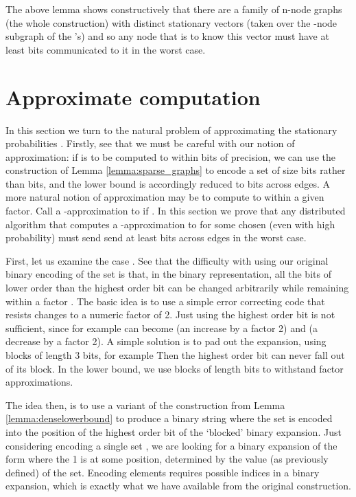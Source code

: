 \documentclass[twocolumn]{article}
\begin{document}
The above lemma shows constructively that there are a family of n-node graphs (the whole construction) with  distinct stationary vectors (taken over the -node subgraph of the 's) and so any node that is to know this vector must have at least  bits communicated to it in the worst case.

\section{Approximate computation}
\label{section:approximation}
In this section we turn to the natural problem of approximating the stationary probabilities . Firstly, see that we must be careful with our notion of approximation: if  is to be computed to within  bits of precision, we can use the construction of Lemma \ref{lemma:sparse_graphs} to encode a set of size  bits rather than  bits, and the lower bound is accordingly reduced to  bits across  edges. A more natural notion of approximation may be to compute  to within a given factor. Call  a -approximation to  if . In this section we prove that any distributed algorithm that computes a -approximation to  for some chosen  (even with high probability) must send send at least  bits across  edges in the worst case.

First, let us examine the case . See that the difficulty with using our original binary encoding of the set is that, in the binary representation, all the bits of lower order than the highest order bit can be changed arbitrarily while remaining within a factor . The basic idea is to use a simple error correcting code that resists changes to a numeric factor of 2. Just using the highest order bit is not sufficient, since for example  can become  (an increase by a factor 2) and  (a decrease by a factor 2). A simple solution is to pad out the expansion, using blocks of length 3 bits, for example  Then the highest order bit can never fall out of its block. In the lower bound, we use blocks of length  bits to withstand factor  approximations.

The idea then, is to use a variant of the construction from Lemma \ref{lemma:denselowerbound} to produce a binary string where the set  is encoded into the position of the highest order bit of the `blocked' binary expansion. Just considering encoding a single set , we are looking for a binary expansion of the form  where the 1 is at some position, determined by the value (as previously defined)  of the set. Encoding  elements requires  possible indices in a binary expansion, which is exactly what we have available from the original construction.
\end{document}
